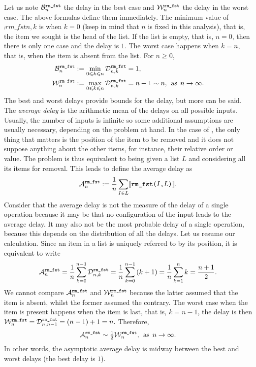 Let us note \(\best{rm\_fst}{n}\) the delay in the best case and
\(\worst{rm\_fst}{n}\) the delay in the worst case. The above formulas
define them immediately. The minimum value of \(\comp{rm\_fst}{n,k}\)
is when \(k=0\) (keep in mind that \(n\) is fixed in this analysis),
that is, the item we sought is the head of the list. If the list is
empty, that is, \(n=0\), then there is only one case and the delay is
\(1\). The worst case happens when \(k=n\), that is, when the item is
absent from the list. For \(n \geqslant 0\),
\begin{align*}
\best{rm\_fst}{n}  &:= 
  \min_{0 \leqslant k \leqslant n}{\comp{rm\_fst}{n,k}} = 1,\\
\worst{rm\_fst}{n} &:=
  \max_{0 \leqslant k \leqslant n}{\comp{rm\_fst}{n,k}} = n + 1
\mathrel{\sim} n,\,\; \text{as} \,\; n \rightarrow \infty.
\end{align*}
The best and worst delays provide bounds for the delay, but more can
be said. The \emph{average delay} is the arithmetic mean of the delays
on all possible inputs. Usually, the number of inputs is infinite so
some additional assumptions are usually necessary, depending on the
problem at hand. In the case of , the only thing
that matters is the position of the item to be removed and it does not
suppose anything about the other items, for instance, their relative order or
value. The problem is thus equivalent to being given a list \(L\) and
considering all its items for removal. This leads to define the
average delay as
\[
\ave{rm\_fst}{n}
  :=
    \frac{1}{n}\sum_{I \in L}\delay{rm\_fst(\(I\),\(L\))}.
\]
Consider that the average delay is not the measure of the delay of a
single operation because it may be that no configuration of the input
leads to the average delay. It may also not be the most probable delay
of a single operation, because this depends on the distribution of all
the delays. Let us resume our calculation. Since an item in a list is
uniquely referred to by its position, it is equivalent to write
\begin{equation}
\ave{rm\_fst}{n}
  = \frac{1}{n}\sum_{k=0}^{n-1}{\comp{rm\_fst}{n,k}}
  = \frac{1}{n}\sum_{k=0}^{n-1}{(k+1)}
  = \frac{1}{n}\sum_{k=1}^{n}{k}
  = \frac{n+1}{2}.\label{ave_rm_fst}
\end{equation}
We cannot compare \(\ave{rm\_fst}{n}\) and \(\worst{rm\_fst}{n}\)
because the latter assumed that the item is absent, whilst the former
assumed the contrary. The worst case when the item is present happens
when the item is last, that is, \(k=n-1\), the delay is then
\(
\worst{rm\_fst}{n} = \comp{rm\_fst}{n,n-1} = (n-1) + 1 = n.
\)
Therefore,
\begin{equation}
\ave{rm\_fst}{n} \mathrel{\sim} \tfrac{1}{2}\worst{rm\_fst}{n},\,\;
\text{as} \,\; n \rightarrow \infty.\label{eq:ave_rm_fst}
\end{equation}
In other words, the asymptotic average delay is midway between the
best and worst delays (the best delay is \(1\)).

